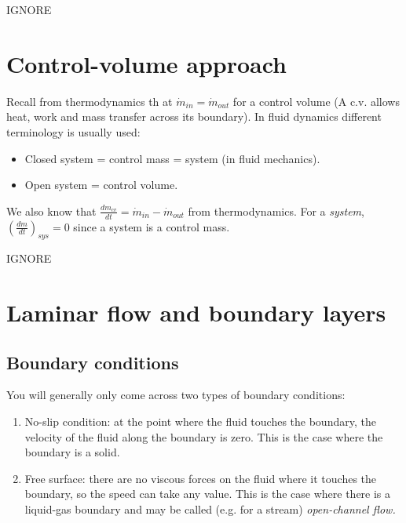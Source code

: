 \documentclass[class=report, crop=false, 12pt,a4paper]{standalone}
\begin{document}
IGNORE

\section{Control-volume approach}
Recall from thermodynamics th
at \(\dot{m}_{in} = \dot{m}_{out}\) for a control volume (A c.v. allows heat, work and mass transfer across its boundary). In fluid dynamics different terminology is usually used:
\begin{itemize}[noitemsep]
  \item Closed system = control mass = system (in fluid mechanics).
  \item Open system = control volume.
\end{itemize}
We also know that \(\frac{dm_{cv}}{dt} = \dot{m}_{in} - \dot{m}_{out} \) from thermodynamics. For a \emph{system}, \( \left( \frac{dm}{dt} \right)_{sys} = 0\) since a system is a control mass. 

IGNORE

\section{Laminar flow and boundary layers}
\subsection{Boundary conditions}
You will generally only come across two types of boundary conditions:
\begin{enumerate}[noitemsep]
  \item No-slip condition: at the point where the fluid touches the boundary, the velocity of the fluid along the boundary is zero. This is the case where the boundary is a solid.
  \item Free surface: there are no viscous forces on the fluid where it touches the boundary, so the speed can take any value. This is the case where there is a liquid-gas boundary and may be called (e.g. for a stream) \emph{open-channel flow.}
\end{enumerate}
\end{document}
